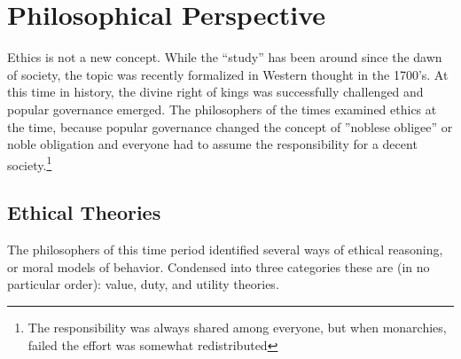 \section*{Philosophical Perspective}
Ethics is not a new concept.  While the ``study'' has been around since the dawn of society, the topic was recently formalized in Western thought in the 1700's.  At this time in history, the divine right of kings was successfully challenged and popular governance emerged.  The philosophers of the times examined ethics at the time, because popular governance changed the concept of ''noblese obligee'' or noble obligation and everyone had to assume the responsibility for a decent society.\footnote{ The responsibility was always shared among everyone, but when monarchies, failed the effort was somewhat redistributed}

\subsection*{Ethical Theories}
The philosophers of this time period identified several ways of ethical reasoning, or moral models of behavior.  Condensed into three categories these are (in no particular order): value, duty, and utility theories.

